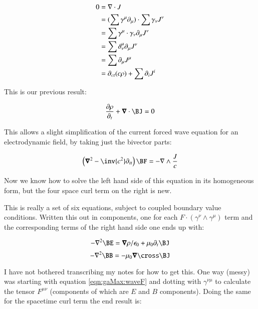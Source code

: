 \begin{align*}
0 
&= \nabla \cdot J \\
&= (\sum \gamma^{\mu} \partial_{\mu}) \cdot \sum \gamma_{\nu} J^{\nu} \\
&= \sum \gamma^{\mu} \cdot \gamma_{\nu} \partial_{\mu} J^{\nu} \\
&= \sum \delta^{\mu}_{\nu} \partial_{\mu} J^{\nu} \\
&= \sum \partial_{\mu} J^{\mu} \\
&= \partial_{ct}(c \rho) + \sum \partial_{i} J^{i} \\
\end{align*}

This is our previous result:

\begin{equation}
\frac{\partial \rho}{\partial_{t}} + \spacegrad \cdot \BJ = 0
\end{equation}

This allows a slight simplification of the current forced wave equation for an electrodynamic field, by taking just the bivector
parts:

\begin{equation}\label{eqn:gaMax:waveF}
\left(\spacegrad^2 - \inv{c^2}\partial_{tt}\right) \BF = -\grad \wedge \frac{J}{c}
\end{equation}

Now we know how to solve the left hand side of this equation in its homogeneous form, but the four space curl term on the right is
new.

This is really a set of six equations, subject to coupled boundary value conditions.  Written this out in components, one for each $F \cdot (\gamma^{\nu} \wedge \gamma^{\mu})$ term and the corresponding terms of the right hand side one ends up with:

\begin{equation*}
-\grad^2 \BE = \spacegrad \rho/\epsilon_0 + \mu_0 \partial_t{\BJ}
\end{equation*}
\begin{equation*}
-\grad^2 \BB = -\mu_0 \spacegrad \cross \BJ
\end{equation*}

I have not bothered transcribing my notes for how to get this.  One way (messy) was starting with equation \ref{eqn:gaMax:waveF} and dotting with $\gamma^{\nu \mu}$ to calculate the tensor $F^{\mu\nu}$ (components of which are $E$ and $B$ components).  Doing the same for the spacetime curl term the end result is:

